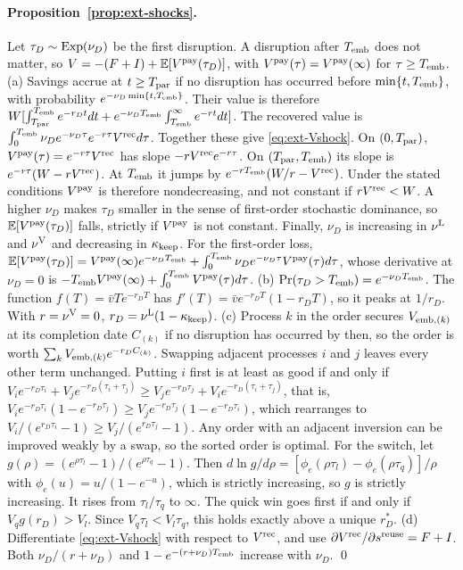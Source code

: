 \paragraph{Proposition~\ref{prop:ext-shocks}.} Let $\tau_D\sim{\rm Exp}(\nu_D)$ be the first disruption. A disruption after $T_{\rm emb}$ does not matter, so $V=-(F+I)+\mathbb E[V^{\rm pay}(\tau_D)]$, with $V^{\rm pay}(\tau)=V^{\rm pay}(\infty)$ for $\tau\ge T_{\rm emb}$.
(a) Savings accrue at $t\ge T_{\rm par}$ if no disruption has occurred before $\min\{t,T_{\rm emb}\}$, with probability $e^{-\nu_D\min\{t,T_{\rm emb}\}}$. Their value is therefore $W[\int_{T_{\rm par}}^{T_{\rm emb}}e^{-r_Dt}dt+e^{-\nu_DT_{\rm emb}}\int_{T_{\rm emb}}^\infty e^{-rt}dt]$. The recovered value is $\int_0^{T_{\rm emb}}\nu_De^{-\nu_D\tau}e^{-r\tau}V^{\rm rec}d\tau$. Together these give \eqref{eq:ext-Vshock}. On $(0,T_{\rm par})$, $V^{\rm pay}(\tau)=e^{-r\tau}V^{\rm rec}$ has slope $-rV^{\rm rec}e^{-r\tau}$. On $(T_{\rm par},T_{\rm emb})$ its slope is $e^{-r\tau}(W-rV^{\rm rec})$. At $T_{\rm emb}$ it jumps by $e^{-rT_{\rm emb}}(W/r-V^{\rm rec})$. Under the stated conditions $V^{\rm pay}$ is therefore nondecreasing, and not constant if $rV^{\rm rec}<W$. A higher $\nu_D$ makes $\tau_D$ smaller in the sense of first-order stochastic dominance, so $\mathbb E[V^{\rm pay}(\tau_D)]$ falls, strictly if $V^{\rm pay}$ is not constant. Finally, $\nu_D$ is increasing in $\nu^{\rm L}$ and $\nu^{\rm V}$ and decreasing in $\kappa_{\rm keep}$. For the first-order loss, $\mathbb E[V^{\rm pay}(\tau_D)]=V^{\rm pay}(\infty)e^{-\nu_DT_{\rm emb}}+\int_0^{T_{\rm emb}}\nu_De^{-\nu_D\tau}V^{\rm pay}(\tau)d\tau$, whose derivative at $\nu_D=0$ is $-T_{\rm emb}V^{\rm pay}(\infty)+\int_0^{T_{\rm emb}}V^{\rm pay}(\tau)d\tau$.
(b) $\Pr(\tau_D>T_{\rm emb})=e^{-\nu_DT_{\rm emb}}$. The function $f(T)=\bar vTe^{-r_DT}$ has $f'(T)=\bar ve^{-r_DT}(1-r_DT)$, so it peaks at $1/r_D$. With $r=\nu^{\rm V}=0$, $r_D=\nu^{\rm L}(1-\kappa_{\rm keep})$.
(c) Process $k$ in the order secures $V_{{\rm emb},(k)}$ at its completion date $C_{(k)}$ if no disruption has occurred by then, so the order is worth $\sum_kV_{{\rm emb},(k)}e^{-r_DC_{(k)}}$. Swapping adjacent processes $i$ and $j$ leaves every other term unchanged. Putting $i$ first is at least as good if and only if $V_ie^{-r_D\tau_i}+V_je^{-r_D(\tau_i+\tau_j)}\ge V_je^{-r_D\tau_j}+V_ie^{-r_D(\tau_i+\tau_j)}$, that is, $V_ie^{-r_D\tau_i}(1-e^{-r_D\tau_j})\ge V_je^{-r_D\tau_j}(1-e^{-r_D\tau_i})$, which rearranges to $V_i/(e^{r_D\tau_i}-1)\ge V_j/(e^{r_D\tau_j}-1)$. Any order with an adjacent inversion can be improved weakly by a swap, so the sorted order is optimal. For the switch, let $g(\rho)=(e^{\rho\tau_l}-1)/(e^{\rho\tau_q}-1)$. Then $d\ln g/d\rho=[\phi_e(\rho\tau_l)-\phi_e(\rho\tau_q)]/\rho$ with $\phi_e(u)=u/(1-e^{-u})$, which is strictly increasing, so $g$ is strictly increasing. It rises from $\tau_l/\tau_q$ to $\infty$. The quick win goes first if and only if $V_qg(r_D)>V_l$. Since $V_q\tau_l<V_l\tau_q$, this holds exactly above a unique $r_D^*$.
(d) Differentiate \eqref{eq:ext-Vshock} with respect to $V^{\rm rec}$, and use $\partial V^{\rm rec}/\partial s^{\rm reuse}=F+I$. Both $\nu_D/(r+\nu_D)$ and $1-e^{-(r+\nu_D)T_{\rm emb}}$ increase with $\nu_D$. \qed

